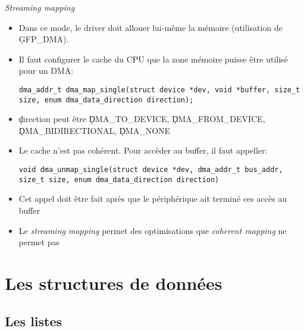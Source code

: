 \begin{frame}[fragile=singleslide]{\emph{Streaming mapping}}
  \begin{itemize} 
  \item  Dans ce  mode, le  driver  doit allouer  lui-même la  mémoire
    (utilisation de \c{GFP_DMA}).
  \item Il faut configurer le cache  du CPU que la zone mémoire puisse
    être utilisé pour un DMA:
    \begin{lstlisting} 
dma_addr_t dma_map_single(struct device *dev, void *buffer, size_t size, enum dma_data_direction direction);
    \end{lstlisting} 
  \item \c{direction} peut être \c{DMA_TO_DEVICE},
    \c{DMA_FROM_DEVICE}, \c{DMA_BIDIRECTIONAL}, \c{DMA_NONE}
  \item Le cache  n'est pas cohérent. Pour accèder  au buffer, il faut
    appeller:
    \begin{lstlisting} 
void dma_unmap_single(struct device *dev, dma_addr_t bus_addr, size_t size, enum dma_data_direction direction)
    \end{lstlisting} 
  \item Cet appel doit être fait après que le périphérique ait terminé
    ces accès au buffer
  \item  Le  \emph{streaming  mapping}  permet des  optimisations  que
    \emph{coherent mapping} ne permet pas
  \end{itemize}
\end{frame} 

\section{Les structures de données}

\subsection{Les listes}

